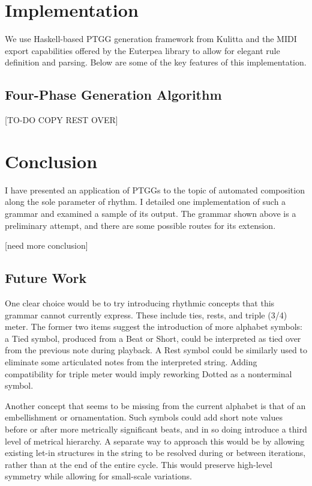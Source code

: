 \documentclass{article}
\begin{document}
\section{Implementation}

We use Haskell-based PTGG generation framework from Kulitta and the MIDI export capabilities offered by the Euterpea library \cite{euterpea} to allow for elegant rule definition and parsing. Below are some of the key features of this implementation.

\subsection{Four-Phase Generation Algorithm} 


[TO-DO COPY REST OVER]


\section{Conclusion}

I have presented an application of PTGGs to the topic of automated composition along the sole parameter of rhythm. I detailed one implementation of such a grammar and examined a sample of its output. The grammar shown above is a preliminary attempt, and there are some possible routes for its extension. 

[need more conclusion]

\subsection{Future Work}

One clear choice would be to try introducing rhythmic concepts that this grammar cannot currently express. These include ties, rests, and triple (3/4) meter. The former two items suggest the introduction of more alphabet symbols: a Tied symbol, produced from a Beat or Short, could be interpreted as tied over from the previous note during playback. A Rest symbol could be similarly used to eliminate some articulated notes from the interpreted string. Adding compatibility for triple meter would imply reworking Dotted as a nonterminal symbol.

Another concept that seems to be missing from the current alphabet is that of an embellishment or ornamentation. Such symbols could add short note values before or after more metrically significant beats, and in so doing introduce a third level of metrical hierarchy. A separate way to approach this would be by allowing existing let-in structures in the string to be resolved during or between iterations, rather than at the end of the entire cycle. This would preserve high-level symmetry while allowing for small-scale variations.
\end{document}
